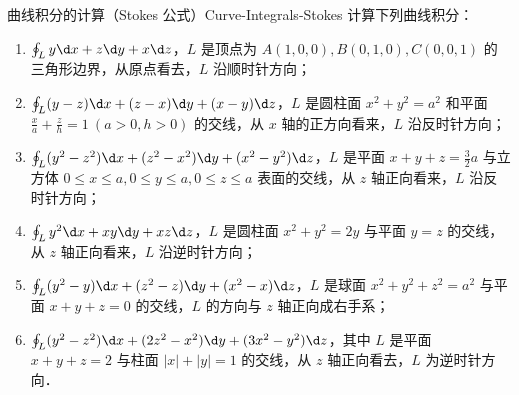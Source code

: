 \begin{problem}{曲线积分的计算（Stokes 公式）}{Curve-Integrals-Stokes}
    计算下列曲线积分：
    \begin{enumerate}
        \item $\oint_L y \d x + z \d y + x \d z$，$L$ 是顶点为 $A(1,0,0), B(0,1,0), C(0,0,1)$ 的三角形边界，从原点看去，$L$ 沿顺时针方向；
        \item $\oint_L (y-z) \d x + (z-x) \d y + (x-y) \d z$，$L$ 是圆柱面 $x^2+y^2=a^2$ 和平面 $\frac{x}{a}+\frac{z}{h}=1 \ (a>0, h>0)$ 的交线，从 $x$ 轴的正方向看来，$L$ 沿反时针方向；
        \item $\oint_L (y^2-z^2) \d x + (z^2-x^2) \d y + (x^2-y^2) \d z$，$L$ 是平面 $x+y+z=\frac{3}{2}a$ 与立方体 $0 \leqslant x \leqslant a, 0 \leqslant y \leqslant a, 0 \leqslant z \leqslant a$ 表面的交线，从 $z$ 轴正向看来，$L$ 沿反时针方向；
        \item $\oint_L y^2 \d x + xy \d y + xz \d z$，$L$ 是圆柱面 $x^2+y^2=2y$ 与平面 $y=z$ 的交线，从 $z$ 轴正向看来，$L$ 沿逆时针方向；
        \item $\oint_L (y^2-y) \d x + (z^2-z) \d y + (x^2-x) \d z$，$L$ 是球面 $x^2+y^2+z^2=a^2$ 与平面 $x+y+z=0$ 的交线，$L$ 的方向与 $z$ 轴正向成右手系；
        \item $\oint_L (y^2-z^2) \d x + (2z^2-x^2) \d y + (3x^2-y^2) \d z$，其中 $L$ 是平面 $x+y+z=2$ 与柱面 $|x|+|y|=1$ 的交线，从 $z$ 轴正向看去，$L$ 为逆时针方向．
    \end{enumerate}
\end{problem}

